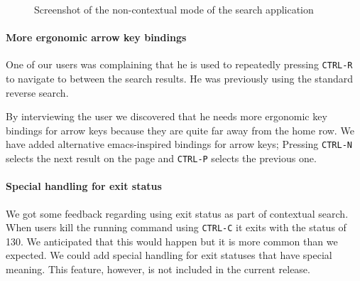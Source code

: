 \begin{figure}
\caption{Screenshot of the non-contextual mode of the search application}
\label{xterm-resh-raw-80}
\end{figure}

\paragraph{More ergonomic arrow key bindings}

One of our users was complaining that he is used to repeatedly pressing \verb|CTRL-R| to navigate to between the search results. He was previously using the standard reverse search.

By interviewing the user we discovered that he needs more ergonomic key bindings for arrow keys because they are quite far away from the home row. We have added alternative emacs-inspired bindings for arrow keys; Pressing \verb|CTRL-N| selects the next result on the page and \verb|CTRL-P| selects the previous one.   


\paragraph{Special handling for exit status}

We got some feedback regarding using exit status as part of contextual search. When users kill the running command using \verb|CTRL-C| it exits with the status of 130.
We anticipated that this would happen but it is more common than we expected.
We could add special handling for exit statuses that have special meaning. This feature, however, is not included in the current release.

